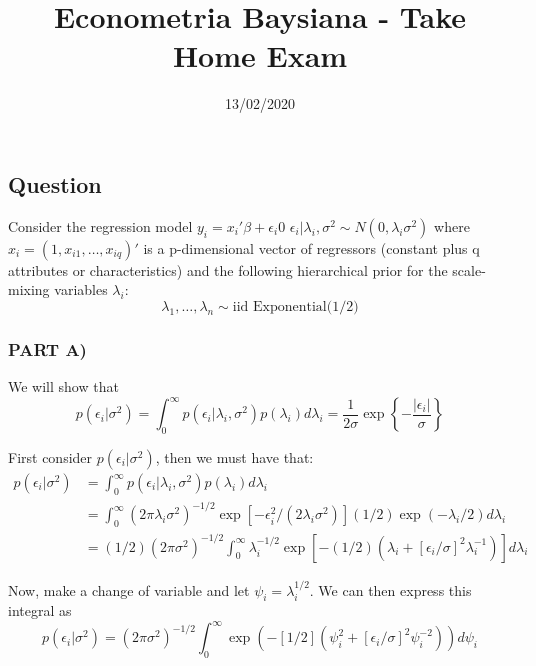 \documentclass[
]{article}
\title{Econometria Baysiana - Take Home Exam}
\author{}
\date{\vspace{-2.5em}13/02/2020}
\begin{document}
\maketitle

\hypertarget{question}{%
\subsection{Question}\label{question}}

Consider the regression model \(y_i = x_i'\beta + \epsilon_i0\)
\(\epsilon_i | \lambda_i ,\sigma^2 \sim N(0, \lambda_i\sigma^2)\) where
\(x_i = (1, x_{i1}, \dots, x_{iq})'\) is a p-dimensional vector of
regressors (constant plus q attributes or characteristics) and the
following hierarchical prior for the scale-mixing variables
\(\lambda_i\): \begin{equation}
\lambda_1, \dots, \lambda_n \sim \text{iid Exponential(1/2)}
\end{equation}

\hypertarget{part-a}{%
\subsubsection{PART A)}\label{part-a}}

We will show that \begin{equation}
p\left(\epsilon_{i} | \sigma^{2}\right)=\int_{0}^{\infty} p\left(\epsilon_{i} | \lambda_{i}, \sigma^{2}\right) p\left(\lambda_{i}\right) d \lambda_{i}=\frac{1}{2 \sigma} \exp \left\{-\frac{\left|\epsilon_{i}\right|}{\sigma}\right\}
\end{equation}

First consider \(p\left(\epsilon_{i} | \sigma^{2}\right)\), then we must
have that: \begin{align}
p\left(\epsilon_{i} | \sigma^{2}\right) &=\int_{0}^{\infty} p\left(\epsilon_{i} | \lambda_{i}, \sigma^{2}\right) p\left(\lambda_{i}\right) d \lambda_{i} \\
&=\int_{0}^{\infty}\left(2 \pi \lambda_{i} \sigma^{2}\right)^{-1 / 2} \exp \left[-\epsilon_{i}^{2} /\left(2 \lambda_{i} \sigma^{2}\right)\right](1 / 2) \exp \left(-\lambda_{i} / 2\right) d \lambda_{i} \\
&=(1 / 2)\left(2 \pi \sigma^{2}\right)^{-1 / 2} \int_{0}^{\infty} \lambda_{i}^{-1 / 2} \exp \left[-(1 / 2)\left(\lambda_{i}+\left[\epsilon_{i} / \sigma\right]^{2} \lambda_{i}^{-1}\right)\right] d \lambda_{i}
\end{align}

Now, make a change of variable and let \(\psi_i = \lambda_i^{1/2}\). We
can then express this integral as \[\begin{equation}
p\left(\epsilon_{i} | \sigma^{2}\right)=\left(2 \pi \sigma^{2}\right)^{-1 / 2} \int_{0}^{\infty} \exp \left(-[1 / 2]\left(\psi_{i}^{2}+\left[\epsilon_{i} / \sigma\right]^{2} \psi_{i}^{-2}\right)\right) d \psi_{i}
\end{equation}\]
\end{document}
